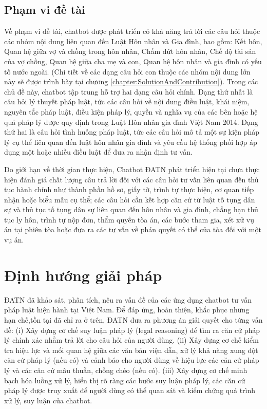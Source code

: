\documentclass[../DoAn.tex]{subfiles}
\begin{document}
\subsection{Phạm vi đề tài}
\label{subsection:1.2.2}
Về phạm vi đề tài, chatbot được phát triển có khả năng trả lời các câu hỏi thuộc các nhóm nội dung liên quan đến Luật Hôn nhân và Gia đình, bao gồm: Kết hôn, Quan hệ giữa vợ và chồng trong hôn nhân, Chấm dứt hôn nhân, Chế độ tài sản của vợ chồng, Quan hệ giữa cha mẹ và con, Quan hệ hôn nhân và gia đình có yếu tố nước ngoài. (Chi tiết về các dạng câu hỏi con thuộc các nhóm nội dung lớn này sẽ được trình bày tại chương \ref{chapter:SolutionAndContribution}). Trong các chủ đề này, chatbot tập trung hỗ trợ hai dạng câu hỏi chính. Dạng thứ nhất là câu hỏi lý thuyết pháp luật, tức các câu hỏi về nội dung điều luật, khái niệm, nguyên tắc pháp luật, điều kiện pháp lý, quyền và nghĩa vụ của các bên hoặc hệ quả pháp lý được quy định trong Luật Hôn nhân gia đình Việt Nam 2014. Dạng thứ hai là câu hỏi tình huống pháp luật, tức các câu hỏi mô tả một sự kiện pháp lý cụ thể liên quan đến luật hôn nhân gia đình và yêu cầu hệ thống phối hợp áp dụng một hoặc nhiều điều luật để đưa ra nhận định tư vấn.


Do giới hạn về thời gian thực hiện, Chatbot ĐATN phát triển hiện tại chưa thực hiện đánh giá chất lượng câu trả lời đối với các câu hỏi tư vấn liên quan đến thủ tục hành chính như thành phần hồ sơ, giấy tờ, trình tự thực hiện, cơ quan tiếp nhận hoặc biểu mẫu cụ thể; các câu hỏi cần kết hợp căn cứ từ luật tố tụng dân sự và thủ tục tố tụng dân sự liên quan đến hôn nhân và gia đình, chẳng hạn thủ tục ly hôn, trình tự nộp đơn, thẩm quyền tòa án, các bước tham gia, xét xử vụ án tại phiên tòa hoặc đưa ra các tư vấn về phán quyết có thể của tòa đối với một vụ án.


\section{Định hướng giải pháp}
\label{section:1.3}


ĐATN đã khảo sát, phân tích, nêu ra vấn đề của các ứng dụng chatbot tư vấn pháp luật hiện hành tại Việt Nam. Để đáp ứng, hoàn thiện, khắc phục những hạn chế,tồn tại đã chỉ ra ở trên, ĐATN đưa ra phương án giải quyết cho từng vấn đề: (i) Xây dựng cơ chế suy luận pháp lý (legal reasoning) để tìm ra căn cứ pháp lý chính xác nhằm trả lời cho câu hỏi của người dùng. (ii) Xây dựng cơ chế kiểm tra hiệu lực và mối quan hệ giữa các văn bản viện dẫn, xử lý khả năng xung đột căn cứ pháp lý (nếu có) và cảnh báo cho người dùng về hiệu lực các căn cứ pháp lý và các căn cứ mâu thuẫn, chồng chéo (nếu có). (iii) Xây dựng cơ chế minh bạch hóa luồng xử lý, hiển thị rõ ràng các bước suy luận pháp lý, các căn cứ pháp lý được truy xuất để
người dùng có thể quan sát và kiểm chứng quá trình xử lý, suy luận của chatbot.
\end{document}
